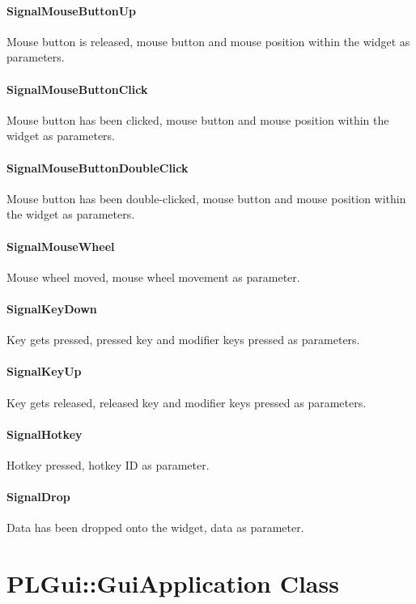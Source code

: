 \paragraph{SignalMouseButtonUp}
Mouse button is released, mouse button and mouse position within the widget as parameters.

\paragraph{SignalMouseButtonClick}
Mouse button has been clicked, mouse button and mouse position within the widget as parameters.

\paragraph{SignalMouseButtonDoubleClick}
Mouse button has been double-clicked, mouse button and mouse position within the widget as parameters.

\paragraph{SignalMouseWheel}
Mouse wheel moved, mouse wheel movement as parameter.

\paragraph{SignalKeyDown}
Key gets pressed, pressed key and modifier keys pressed as parameters.

\paragraph{SignalKeyUp}
Key gets released, released key and modifier keys pressed as parameters.

\paragraph{SignalHotkey}
Hotkey pressed, hotkey ID as parameter.

\paragraph{SignalDrop}
Data has been dropped onto the widget, data as parameter.




\section{PLGui::GuiApplication Class}


